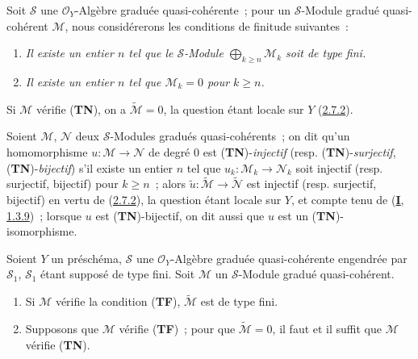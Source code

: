 \begin{env}[3.4.2]
\label{II.3.4.2-fr}
Soit $\mathcal{S}$ une $\mathcal{O}_Y$-Algèbre graduée quasi-cohérente~; pour
un $\mathcal{S}$-Module gradué quasi-cohérent $\mathcal{M}$, nous considérerons
les conditions de finitude suivantes~:
\begin{enumerate}
  \item[(\textbf{TF})] \emph{Il existe un entier $n$ tel que le
    $\mathcal{S}$-Module $\bigoplus_{k\geq n}\mathcal{M}_k$ soit de type fini.}
  \item[(\textbf{TN})] \emph{Il existe un entier $n$ tel que
    $\mathcal{M}_k=0$ pour $k\geq n$.}
\end{enumerate}
Si $\mathcal{M}$ vérifie (\textbf{TN}), on a
$\widetilde{\mathcal{M}}=0$, la question étant locale sur $Y$
(\hyperref[II.2.7.2-fr]{2.7.2}).

Soient $\mathcal{M}$, $\mathcal{N}$ deux $\mathcal{S}$-Modules gradués
quasi-cohérents~; on dit qu'un homomorphisme
$u:\mathcal{M}\to\mathcal{N}$ de degré $0$ est
(\textbf{TN})-\emph{injectif} (resp. (\textbf{TN})-\emph{surjectif},
(\textbf{TN})-\emph{bijectif}) s'il existe un entier $n$ tel que
$u_k:\mathcal{M}_k\to\mathcal{N}_k$ soit injectif (resp. surjectif, bijectif)
pour $k\geq n$~; alors
$\widetilde{u}:\widetilde{\mathcal{M}}\to\widetilde{\mathcal{N}}$ est injectif
(resp. surjectif, bijectif) en vertu de
(\hyperref[II.2.7.2-fr]{2.7.2}), la question étant locale sur $Y$, et compte
tenu de (\hyperref[I.1.3.9-fr]{\textbf{I}, 1.3.9})~; lorsque $u$ est
(\textbf{TN})-bijectif, on dit aussi que $u$ est un
(\textbf{TN})-isomorphisme.
\end{env}

\begin{proposition}[3.4.3]
\label{II.3.4.3-fr}
Soient $Y$ un préschéma, $\mathcal{S}$ une $\mathcal{O}_Y$-Algèbre graduée
quasi-cohérente engendrée par $\mathcal{S}_1$, $\mathcal{S}_1$ étant supposé
de type fini. Soit $\mathcal{M}$ un $\mathcal{S}$-Module gradué
quasi-cohérent.
\begin{enumerate}
  \item[\rm(i)] Si $\mathcal{M}$ vérifie la condition \textup{(\textbf{TF})},
    $\widetilde{\mathcal{M}}$ est de type fini.
  \item[\rm(ii)] Supposons que $\mathcal{M}$ vérifie \textup{(\textbf{TF})}~; pour que
    $\widetilde{\mathcal{M}}=0$, il faut et il suffit que $\mathcal{M}$
    vérifie \textup{(\textbf{TN})}.
\end{enumerate}
\end{proposition}

